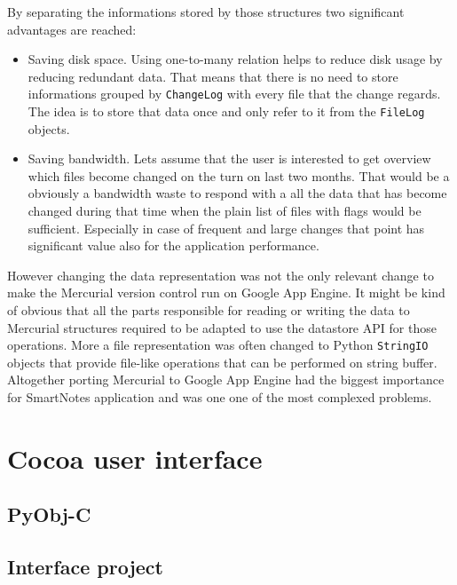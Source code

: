 
By separating the informations stored by those structures two significant advantages are reached:
\begin{itemize}
\item{Saving disk space. Using one-to-many relation helps to reduce disk usage by reducing redundant data. That means that there is no need to store informations grouped by \texttt{ChangeLog} with every file that the change regards. The idea is to store that data once and only refer to it from the \texttt{FileLog} objects.}
\item{Saving bandwidth. Lets assume that the user is interested to get overview which files become changed on the turn on last two months. That would be a obviously a bandwidth waste to respond with a all the data that has become changed during that time when the plain list of files with flags would be sufficient. Especially in case of frequent and large changes that point has significant value also for the application performance.}
\end{itemize}

However changing the data representation was not the only relevant change to make the Mercurial version control run on Google App Engine. It might be kind of obvious that all the parts responsible
for reading or writing the data to Mercurial structures required to be adapted to use the datastore API for those operations. More a file representation was often changed to Python \texttt{StringIO} objects that provide file-like operations that can be performed on string buffer. Altogether porting Mercurial to Google App Engine had the biggest importance for SmartNotes application and was one one of the most complexed problems.       

\section{Cocoa user interface}\label{sec:cocoa}
\subsection{PyObj-C}
\subsection{Interface project}
